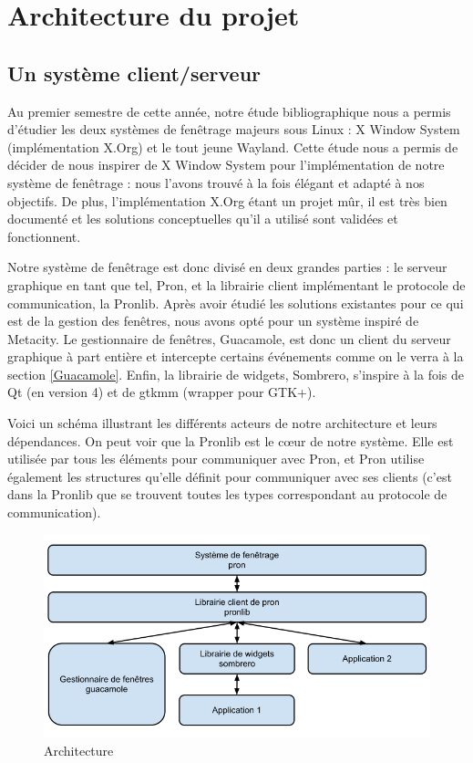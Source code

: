 \section{Architecture du projet}

\subsection{Un système client/serveur}

Au premier semestre de cette année, notre étude bibliographique nous a permis d'étudier les deux systèmes de fenêtrage majeurs sous Linux : X Window System (implémentation X.Org) et le tout jeune Wayland.
Cette étude nous a permis de décider de nous inspirer de X Window System pour l'implémentation de notre système de fenêtrage : nous l'avons trouvé à la fois élégant et adapté à nos objectifs.
De plus, l'implémentation X.Org étant un projet mûr, il est très bien documenté et les solutions conceptuelles qu'il a utilisé sont validées et fonctionnent.

Notre système de fenêtrage est donc divisé en deux grandes parties : le serveur graphique en tant que tel, Pron, et la librairie client implémentant le protocole de communication, la Pronlib.
Après avoir étudié les solutions existantes pour ce qui est de la gestion des fenêtres, nous avons opté pour un système inspiré de Metacity.
Le gestionnaire de fenêtres, Guacamole, est donc un client du serveur graphique à part entière et intercepte certains événements comme on le verra à la section \ref{Guacamole}.
Enfin, la librairie de widgets, Sombrero, s'inspire à la fois de Qt (en version 4) et de gtkmm (wrapper pour GTK+).

Voici un schéma illustrant les différents acteurs de notre architecture et leurs dépendances.
On peut voir que la Pronlib est le cœur de notre système.
Elle est utilisée par tous les éléments pour communiquer avec Pron, et Pron utilise également les structures qu'elle définit pour communiquer avec ses clients (c'est dans la Pronlib que se trouvent toutes les types correspondant au protocole de communication).
  
\begin{figure}[H]
  \centering
  \includegraphics[width=14cm]{images/architecture.png}
  \caption{Architecture}
  \label{fig:architecture}
\end{figure}


